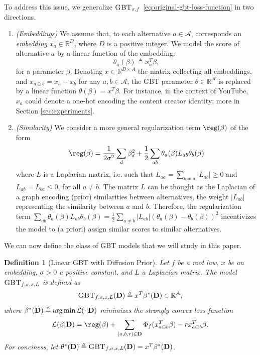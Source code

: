 \documentclass{article}
\newcommand{\setR}{\mathbb R}
\DeclareMathOperator*{\argmin}{arg\,min}
\newtheorem{definition}{Definition}
\newcommand{\GBT}{\textsc{GBT}}
\newcommand{\cA}{\mathcal A}
\newcommand{\cL}{\mathcal L}
\newcommand{\bD}{{\bf D}}
\newcommand{\bbR}{\mathbb R}
\newcommand{\eqdef}{\triangleq}
\newcommand{\ab}{a\ominus{} b}
\begin{document}
To address this issue, we generalize $\GBT_{\sigma, f}$ \eqref{eq:original-gbt-loss-function}
in two directions.
\begin{enumerate}[leftmargin=3ex]
  \item \emph{(Embeddings)} We assume that, to each alternative $a \in \cA$, corresponds an \emph{embedding} $x_a \in \bbR^D$, where $D$ is a positive integer.
    We model the score of alternative $a$ by a linear function of the embedding: \[\theta_a(\beta) \eqdef x_a^T \beta,\] for a parameter $\beta$.
    Denoting $x \in \bbR^{D \times A}$ the matrix collecting all embeddings, and $x_{\ab{}} = x_a - x_b$ for any $a, b \in\cA$, the GBT parameter $\theta\in\bbR^\cA$ is replaced by a linear function $\theta(\beta) = x^T\beta$.
    For instance, in the context of YouTube, $x_a$ could denote a one-hot encoding the content creator identity; more in Section \ref{sec:experiments}.
  \item \emph{(Similarity)} We consider a more general regularization term $\reg(\beta)$
    of the form
    \begin{equation}
      \reg(\beta)
      = \frac{1}{2\sigma^2} \sum_{d} \beta_d^2
      + \frac{1}{2} \sum_{ab} \theta_a(\beta) L_{ab} \theta_b(\beta)
    \end{equation}
    where $L$ is a Laplacian matrix, i.e. such that
    $L_{aa} = \sum_{b\ne a} |L_{ab}| \ge 0$ and $L_{ab} = L_{ba} \le 0$,
    for all $a \ne b$.
    The matrix $L$ can be thought as the Laplacian of
    a graph encoding (prior) similarities between alternatives,
    the weight $|L_{ab}|$ representing the similarity between $a$ and $b$.
    Therefore, the regularization term
    $\sum_{ab} \theta_a(\beta) L_{ab} \theta_b(\beta)
    = \frac{1}{2}\sum_{a \ne b} |L_{ab}|(\theta_a(\beta) - \theta_b(\beta))^2$
    incentivizes the model to (a priori) assign similar scores to similar alternatives.
\end{enumerate}

We can now define the class of GBT models that we will study in this paper.
\begin{definition}[Linear GBT with Diffusion Prior]
    \label{def:gbt-with-prior-similarities}
    Let $f$ be a root law, $x$ be an embedding, $\sigma > 0$ a positive constant, and $L$ a Laplacian matrix.
    The model $\GBT_{f,\sigma,x,L}$ is defined as
            $$\GBT_{f,\sigma,x,L}(\bD) \eqdef x^T \beta^*(\bD) \in \setR^A,$$
    where $\beta^* (\bD) \triangleq \argmin \cL(\cdot | \bD)$ minimizes the strongly convex loss function
    \begin{equation}
    \label{eq:gbt-datasets-loss-function}
        \cL(\beta | \bD) =
        \reg(\beta)
          + \sum_{(a,b,r) \in \bD} \Phi_f(x_{\ab}^T \beta) - r x_{\ab}^T \beta.
    \end{equation}
    For conciness, let $\theta^*(\bD) \eqdef \GBT_{f,\sigma,x,L}(\bD) = x^T \beta^*(\bD)$.
\end{definition}
\end{document}
